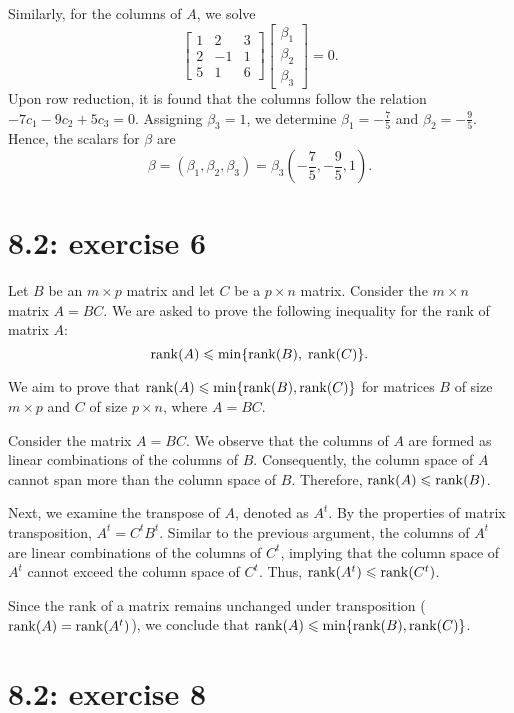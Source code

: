 \documentclass{report}
\begin{document}
Similarly, for the columns of $A$, we solve
\[
\begin{bmatrix}
1 & 2 & 3 \\
2 & -1 & 1 \\
5 & 1 & 6
\end{bmatrix}
\begin{bmatrix}
\beta_1 \\
\beta_2 \\
\beta_3
\end{bmatrix} = 0.
\]
Upon row reduction, it is found that the columns follow the relation $-7c_1 - 9c_2 + 5c_3 = 0$. Assigning $\beta_3 = 1$, we determine $\beta_1 = -\frac{7}{5}$ and $\beta_2 = -\frac{9}{5}$. Hence, the scalars for $\beta$ are
\[
\beta = (\beta_1, \beta_2, \beta_3) = \beta_3\left(-\frac{7}{5}, -\frac{9}{5}, 1\right).
\]




\section*{8.2: exercise 6} 

Let $B$ be an $m \times p$ matrix and let $C$ be a $p \times n$ matrix. Consider the $m \times n$ matrix $A = BC$. We are asked to prove the following inequality for the rank of matrix $A$:
\[
\operatorname{rank}(A) \leqslant \min\{\operatorname{rank}(B),\;\operatorname{rank}(C)\}.
\]

\sol

We aim to prove that $\operatorname{rank}(A) \leqslant \min\{\operatorname{rank}(B),\operatorname{rank}(C)\}$ for matrices $B$ of size $m \times p$ and $C$ of size $p \times n$, where $A = BC$. 


Consider the matrix $A = BC$. We observe that the columns of $A$ are formed as linear combinations of the columns of $B$. Consequently, the column space of $A$ cannot span more than the column space of $B$. Therefore, $\operatorname{rank}(A) \leqslant \operatorname{rank}(B)$.

Next, we examine the transpose of $A$, denoted as $A^t$. By the properties of matrix transposition, $A^t = C^tB^t$. Similar to the previous argument, the columns of $A^t$ are linear combinations of the columns of $C^t$, implying that the column space of $A^t$ cannot exceed the column space of $C^t$. Thus, $\operatorname{rank}(A^t) \leqslant \operatorname{rank}(C^t)$.

Since the rank of a matrix remains unchanged under transposition ($\operatorname{rank}(A) = \operatorname{rank}(A^t)$), we conclude that $\operatorname{rank}(A) \leqslant \min\{\operatorname{rank}(B),\operatorname{rank}(C)\}$.


\section*{8.2: exercise 8} 
\end{document}
